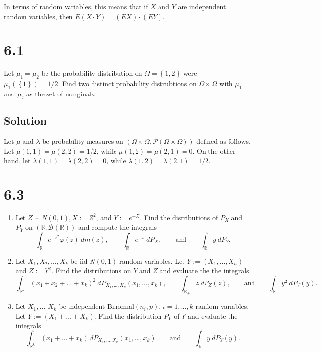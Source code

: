 \documentclass[12pt]{article}
\begin{document}
In terms of random variables, this means that if $X$ and $Y$ are independent random variables, then $E(X\cdot Y) = (EX)\cdot(EY)$.







\newpage 
\section*{6.1}
Let $\mu_{1} = \mu_{2}$ be the probability distribution on $\Omega = \left\{ 1,2 \right\}$ were $\mu_{1}(\left\{ 1 \right\}) = 1/2$. Find two distinct
probability distrubtions on $\Omega \times \Omega$ with $\mu_{1}$ and $\mu_{2}$ as the set of marginals.

\subsection*{Solution}
Let $\mu$ and $\lambda$ be probability measures on $(\Omega \times \Omega, \mathcal{P}(\Omega\times \Omega))$ defined as follows. 
Let $\mu(1,1) = \mu(2,2) = 1/2$, while $\mu(1,2) = \mu(2,1) = 0$. On the other hand, let $\lambda(1,1) = \lambda(2,2) = 0$, while $\lambda(1,2) =
\lambda(2,1) = 1/2$.






\newpage 
\section*{6.3}
\begin{enumerate}[label=(\alph*)]
\item Let $Z \sim N(0,1), X := Z^{2}$, and $Y := e^{-X}$. Find the distributions of $P_{X}$ and $P_{Y}$ on $(\mathbb{R}, \mathcal{B}(\mathbb{R}))$ and
compute the integrals
\[ \int_{\mathbb{R}}e^{-z^{2}}\varphi(z)\ dm(z), \qquad \int_{\mathbb{R}}e^{-x}\ dP_{X}, \qquad \text{and} \qquad \int_{\mathbb{R}}y\ dP_{Y}. \]
\item Let $X_{1}, X_{2}, \hdots, X_{k}$ be iid $N(0,1)$ random variables. Let $Y := (X_{1}, \dots, X_{n})$ and $Z := Y^{2}$. Find the distributions
on $Y$ and $Z$ and evaluate the the integrals
\[ \int_{\mathbb{R}^{k}}(x_{1} + x_{2} + \dots + x_{k})^{2}\ dP_{X_{1},\hdots,X_{k}}(x_{1},\hdots,x_{k}), \qquad \int_{\mathbb{R}_{+}}z\ dP_{Z}(z),
\qquad\text{and}\qquad \int_{\mathbb{R}}y^{2}\ dP_{Y}(y).  \]
\item Let $X_{1}, \hdots, X_{k}$ be independent Binomial$(n_{i}, p)$, $i = 1, \hdots, k$ random variables. Let $Y := (X_{1} + \dots + X_{k})$. Find
the distribution $P_{Y}$ of $Y$ and evaluate the integrals 
\[ \int_{\mathbb{R}^{k}}(x_{1} + \dots + x_{k})\ dP_{X_{1},\hdots,X_{k}}(x_{1},\hdots,x_{k}) \qquad \text{and} \qquad \int_{\mathbb{R}}y\ dP_{Y}(y). \]
\end{enumerate}
\end{document}
